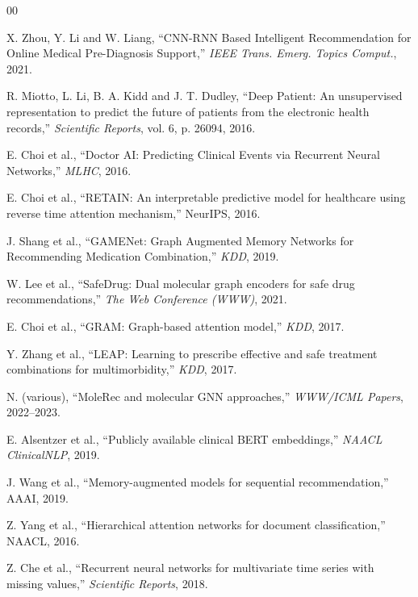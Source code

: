 \documentclass[conference,onecolumn]{IEEEtran}
\begin{document}
\balance

\begin{thebibliography}{00}

 X. Zhou, Y. Li and W. Liang, ``CNN-RNN Based Intelligent Recommendation for Online Medical Pre-Diagnosis Support,'' \textit{IEEE Trans. Emerg. Topics Comput.}, 2021.

 R. Miotto, L. Li, B. A. Kidd and J. T. Dudley, ``Deep Patient: An unsupervised representation to predict the future of patients from the electronic health records,'' \textit{Scientific Reports}, vol. 6, p. 26094, 2016.

 E. Choi et al., ``Doctor AI: Predicting Clinical Events via Recurrent Neural Networks,'' \textit{MLHC}, 2016.

 E. Choi et al., ``RETAIN: An interpretable predictive model for healthcare using reverse time attention mechanism,'' NeurIPS, 2016.

 J. Shang et al., ``GAMENet: Graph Augmented Memory Networks for Recommending Medication Combination,'' \textit{KDD}, 2019.

 W. Lee et al., ``SafeDrug: Dual molecular graph encoders for safe drug recommendations,'' \textit{The Web Conference (WWW)}, 2021.

 E. Choi et al., ``GRAM: Graph-based attention model,'' \textit{KDD}, 2017.

 Y. Zhang et al., ``LEAP: Learning to prescribe effective and safe treatment combinations for multimorbidity,'' \textit{KDD}, 2017.

 N. (various), ``MoleRec and molecular GNN approaches,'' \textit{WWW/ICML Papers}, 2022--2023.

 E. Alsentzer et al., ``Publicly available clinical BERT embeddings,'' \textit{NAACL ClinicalNLP}, 2019.

 J. Wang et al., ``Memory-augmented models for sequential recommendation,'' AAAI, 2019.

 Z. Yang et al., ``Hierarchical attention networks for document classification,'' NAACL, 2016.

 Z. Che et al., ``Recurrent neural networks for multivariate time series with missing values,'' \textit{Scientific Reports}, 2018.


\end{thebibliography}
\end{document}
